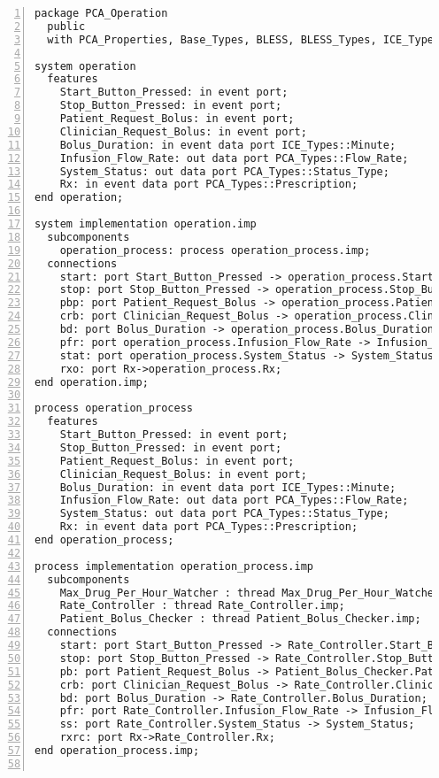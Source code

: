 \singlespacing
\begin{lstlisting}[language=aadl, gobble=0, numbers=left, caption={\lstinline{PCA_Operation} package}, label={listing:aadl:pca_operation}]
package PCA_Operation
  public
  with PCA_Properties, Base_Types, BLESS, BLESS_Types, ICE_Types, PCA_Types;

system operation
  features
    Start_Button_Pressed: in event port;
    Stop_Button_Pressed: in event port;  
    Patient_Request_Bolus: in event port;
    Clinician_Request_Bolus: in event port; 
    Bolus_Duration: in event data port ICE_Types::Minute;
    Infusion_Flow_Rate: out data port PCA_Types::Flow_Rate;
    System_Status: out data port PCA_Types::Status_Type;
    Rx: in event data port PCA_Types::Prescription;
end operation;

system implementation operation.imp
  subcomponents
    operation_process: process operation_process.imp;
  connections
  	start: port Start_Button_Pressed -> operation_process.Start_Button_Pressed;
    stop: port Stop_Button_Pressed -> operation_process.Stop_Button_Pressed;
  	pbp: port Patient_Request_Bolus -> operation_process.Patient_Request_Bolus;
  	crb: port Clinician_Request_Bolus -> operation_process.Clinician_Request_Bolus;
  	bd: port Bolus_Duration -> operation_process.Bolus_Duration;
  	pfr: port operation_process.Infusion_Flow_Rate -> Infusion_Flow_Rate;
    stat: port operation_process.System_Status -> System_Status;
    rxo: port Rx->operation_process.Rx;
end operation.imp;

process operation_process
  features
  	Start_Button_Pressed: in event port;
    Stop_Button_Pressed: in event port;  
    Patient_Request_Bolus: in event port;
    Clinician_Request_Bolus: in event port; 
    Bolus_Duration: in event data port ICE_Types::Minute;
    Infusion_Flow_Rate: out data port PCA_Types::Flow_Rate;
    System_Status: out data port PCA_Types::Status_Type;
    Rx: in event data port PCA_Types::Prescription; 
end operation_process;

process implementation operation_process.imp
  subcomponents
    Max_Drug_Per_Hour_Watcher : thread Max_Drug_Per_Hour_Watcher.imp;
    Rate_Controller : thread Rate_Controller.imp;
    Patient_Bolus_Checker : thread Patient_Bolus_Checker.imp;
  connections
  	start: port Start_Button_Pressed -> Rate_Controller.Start_Button_Pressed;
    stop: port Stop_Button_Pressed -> Rate_Controller.Stop_Button_Pressed;
    pb: port Patient_Request_Bolus -> Patient_Bolus_Checker.Patient_Request_Bolus;
    crb: port Clinician_Request_Bolus -> Rate_Controller.Clinician_Request_Bolus;
    bd: port Bolus_Duration -> Rate_Controller.Bolus_Duration;
    pfr: port Rate_Controller.Infusion_Flow_Rate -> Infusion_Flow_Rate;
    ss: port Rate_Controller.System_Status -> System_Status;
    rxrc: port Rx->Rate_Controller.Rx;       
end operation_process.imp;


\end{lstlisting}
